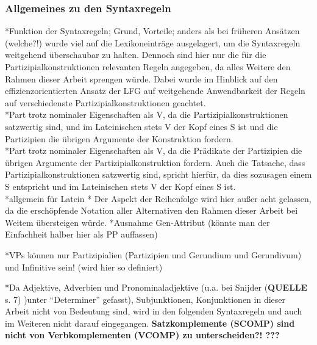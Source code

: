 \documentclass[12pt,a4paper]{article}
\begin{document}
\subsubsection{Allgemeines zu den Syntaxregeln}
*Funktion der Syntaxregeln; Grund, Vorteile; anders als bei früheren Ansätzen (welche?!) wurde viel auf die Lexikoneinträge ausgelagert, um die Syntaxregeln weitgehend überschaubar zu halten. Dennoch sind hier nur die für die Partizipialkonstruktionen relevanten Regeln angegeben, da alles Weitere den Rahmen dieser Arbeit sprengen würde. Dabei wurde im Hinblick auf den effizienzorientierten Ansatz der LFG auf weitgehende Anwendbarkeit der Regeln auf verschiedenste Partizipialkonstruktionen geachtet. \\

*Part trotz nominaler Eigenschaften als V, da die Partizipialkonstruktionen satzwertig sind, und im Lateinischen stets V der Kopf eines S ist und die 
Partizipien die übrigen Argumente der Konstruktion fordern.\\

*Part trotz nominaler Eigenschaften als V, da die Prädikate der Partizipien die übrigen Argumente der Partizipialkonstruktion fordern. Auch die Tatsache, dass Partizipialkonstruktionen satzwertig sind, spricht hierfür, da dies sozusagen einem S entspricht und im Lateinischen stets V der Kopf eines S ist.\\


*allgemein für Latein
* Der Aspekt der Reihenfolge wird hier außer acht gelassen, da die erschöpfende Notation aller Alternativen den Rahmen dieser Arbeit bei Weitem übersteigen würde.
*Ausnahme Gen-Attribut (könnte man der Einfachheit halber hier als PP auffassen)

*VPs können nur Partizipialien (Partizipien und Gerundium und Gerundivum) und Infinitive sein! (wird hier so definiert)

*Da Adjektive, Adverbien und Pronominaladjektive (u.a. bei Snijder (\textbf{QUELLE} s. 7) )unter ``Determiner'' gefasst), Subjunktionen, Konjunktionen in dieser Arbeit nicht von Bedeutung sind, wird in den folgenden Syntaxregeln und auch im Weiteren nicht darauf eingegangen. \textbf{Satzkomplemente (SCOMP) sind nicht von Verbkomplementen (VCOMP) zu unterscheiden?! ???}
\end{document}
